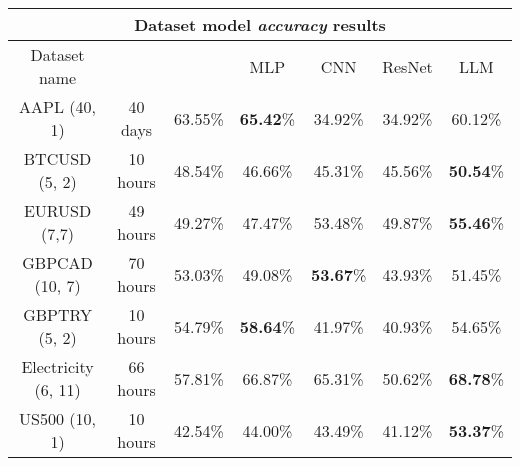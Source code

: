 \begin{center}
	\begin{tabular}{|| c || c | c | c | c | c | c ||}
		\hline
		\multicolumn{7}{|c|}{Dataset model \emph{accuracy} results}                                                                                                                                          \\
		\hline
		Dataset name        & \vtop{\hbox{\strut Prediction}\hbox{\strut timestep}} & \vtop{\hbox{\strut Linear}\hbox{\strut Regression}} & MLP              & CNN              & ResNet  & LLM              \\ [0.5ex]
		\hline\hline
		AAPL (40, 1)        & 40 days                                               & 63.55\%                                             & \textbf{65.42}\% & 34.92\%          & 34.92\% & 60.12\%           \\
		\hline
		BTCUSD (5, 2)       & 10 hours                                              & 48.54\%                                             & 46.66\%          & 45.31\%          & 45.56\% & \textbf{50.54}\% \\
		\hline
		EURUSD (7,7)        & 49 hours                                              & 49.27\%                                             & 47.47\%          & 53.48\%          & 49.87\% & \textbf{55.46}\% \\
		\hline
		GBPCAD (10, 7)      & 70 hours                                              & 53.03\%                                             & 49.08\%          & \textbf{53.67}\% & 43.93\% & 51.45\%          \\
		\hline
		GBPTRY (5, 2)       & 10 hours                                              & 54.79\%                                             & \textbf{58.64}\% & 41.97\%          & 40.93\% & 54.65\%          \\
		\hline
		Electricity (6, 11) & 66 hours                                              & 57.81\%                                             & 66.87\%          & 65.31\%          & 50.62\% & \textbf{68.78}\% \\
		\hline
		US500 (10, 1)       & 10 hours                                              & 42.54\%                                             & 44.00\%          & 43.49\%          & 41.12\% & \textbf{53.37}\% \\
		\hline

		\hline
	\end{tabular}
\end{center}



